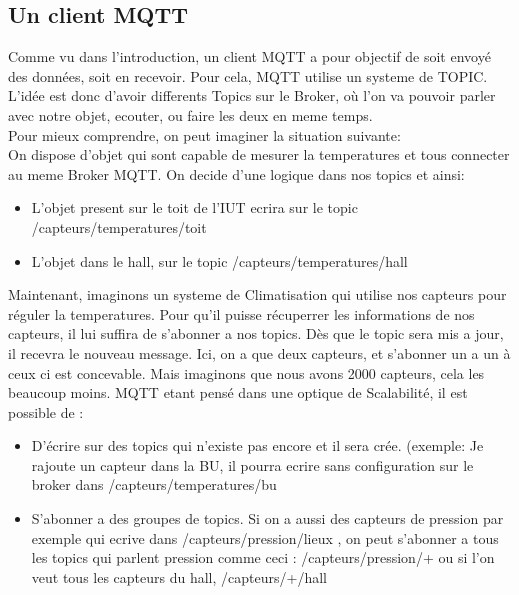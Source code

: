 \documentclass[a4paper,10pt]{article}
\begin{document}
\subsection{Un client MQTT}
 Comme vu dans l'introduction, un client MQTT a pour objectif de soit envoyé des données, soit en recevoir. Pour cela, MQTT utilise un systeme de TOPIC. L'idée est donc d'avoir differents Topics sur le Broker, où l'on va pouvoir parler avec notre objet, ecouter, ou faire les deux en meme temps.\\
 Pour mieux comprendre, on peut imaginer la situation suivante:\\
 On dispose d'objet qui sont capable de mesurer la temperatures et tous connecter au meme Broker MQTT.
 On decide d'une logique dans nos topics et ainsi:
 \begin{itemize}
  \item L'objet present sur le toit de l'IUT ecrira sur le topic /capteurs/temperatures/toit
  \item L'objet dans le hall, sur le topic /capteurs/temperatures/hall
 \end{itemize}
Maintenant, imaginons un systeme de Climatisation qui utilise nos capteurs pour réguler la temperatures. Pour qu'il puisse récuperrer les informations de nos capteurs, il lui suffira de s'abonner a nos topics. Dès que le topic sera mis a jour, il recevra le nouveau message.
Ici, on a que deux capteurs, et s'abonner un a un à ceux ci est concevable. Mais imaginons que nous avons 2000 capteurs, cela les beaucoup moins. MQTT etant pensé dans une optique de Scalabilité, il est possible de :
\begin{itemize}
 \item D'écrire sur des topics qui n'existe pas encore et il sera crée. (exemple: Je rajoute un capteur dans la BU, il pourra ecrire sans configuration sur le broker dans /capteurs/temperatures/bu
 \item S'abonner a des groupes de topics. Si on a aussi des capteurs de pression par exemple qui ecrive dans /capteurs/pression/lieux , on peut s'abonner a tous les topics qui parlent pression comme ceci : /capteurs/pression/+ ou si l'on veut tous les capteurs du hall, /capteurs/+/hall
 
\end{itemize}
\end{document}
